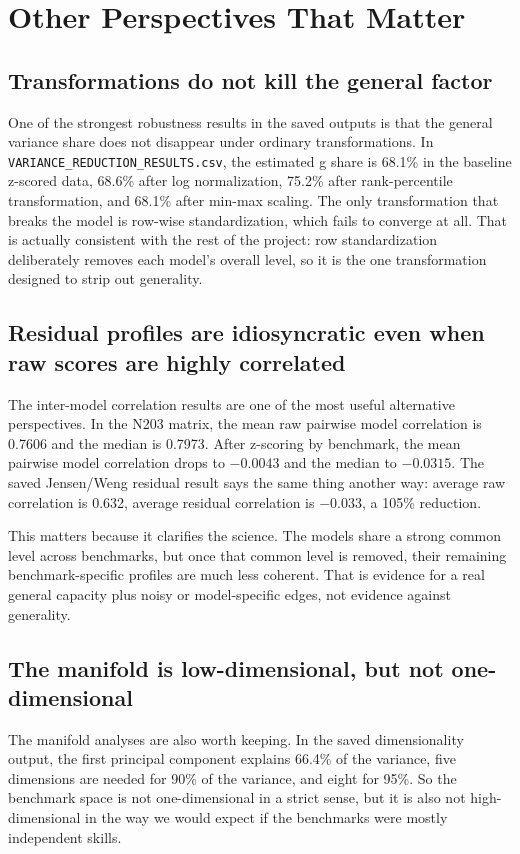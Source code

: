 \documentclass[11pt]{article}
\begin{document}
\section{Other Perspectives That Matter}
\subsection{Transformations do not kill the general factor}
One of the strongest robustness results in the saved outputs is that the general variance share does not disappear under ordinary transformations. In \texttt{VARIANCE\_REDUCTION\_RESULTS.csv}, the estimated g share is 68.1\% in the baseline z-scored data, 68.6\% after log normalization, 75.2\% after rank-percentile transformation, and 68.1\% after min-max scaling. The only transformation that breaks the model is row-wise standardization, which fails to converge at all. That is actually consistent with the rest of the project: row standardization deliberately removes each model's overall level, so it is the one transformation designed to strip out generality.

\subsection{Residual profiles are idiosyncratic even when raw scores are highly correlated}
The inter-model correlation results are one of the most useful alternative perspectives. In the N203 matrix, the mean raw pairwise model correlation is 0.7606 and the median is 0.7973. After z-scoring by benchmark, the mean pairwise model correlation drops to $-0.0043$ and the median to $-0.0315$. The saved Jensen/Weng residual result says the same thing another way: average raw correlation is 0.632, average residual correlation is $-0.033$, a 105\% reduction.

This matters because it clarifies the science. The models share a strong common level across benchmarks, but once that common level is removed, their remaining benchmark-specific profiles are much less coherent. That is evidence for a real general capacity plus noisy or model-specific edges, not evidence against generality.

\subsection{The manifold is low-dimensional, but not one-dimensional}
The manifold analyses are also worth keeping. In the saved dimensionality output, the first principal component explains 66.4\% of the variance, five dimensions are needed for 90\% of the variance, and eight for 95\%. So the benchmark space is not one-dimensional in a strict sense, but it is also not high-dimensional in the way we would expect if the benchmarks were mostly independent skills.
\end{document}
